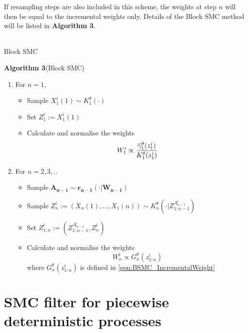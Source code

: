 \documentclass[12pt,a4paper]{article}
\begin{document}
If resampling steps are also included in this scheme, the weights at step $n$ will then be equal to the incremental weights only. Details of the Block SMC method will be listed in \textbf{Algorithm 3}.  
\\\\
\begin{algorithm}
    \caption{Block SMC}
\end{algorithm}
\textbf{Algorithm 3}(Block SMC)
\begin{enumerate}
    \item For $n=1$,
    \begin{itemize}
        \item Sample $X_1^i(1) \sim K_1^{\theta}(\cdot)$
        \item Set $Z_1^i := X_1^i(1)$
        \item Calculate and normalise the weights
        $$W_1^i \propto \frac{\Tilde{\gamma}_1^{\theta}(z_1^i)}{K_1^{\theta}(z_1^i)}$$
    \end{itemize}
    \item For $n = 2,3,..$
    \begin{itemize}
        \item Sample $\mathbf{A_{n-1}} \sim \mathbf{r_{n-1}}(\cdot|\mathbf{W_{n-1}})$
        \item Sample $Z_{n}^i:=(X_n(1),...,X_1(n)) \sim K_n^{\theta}(\cdot|Z_{1:n-1}^{A_{n-1}^i})$
        \item Set $Z_{1:n}^i := \left(Z_{1:n-1}^{A_{n-1}^i},Z_n^i\right)$
        \item Calculate and normalise the weights 
        $$W_n^i \propto G_n^{\theta}(z_{1:n}^i)$$
        where $G_n^{\theta}(z_{1:n}^i)$ is defined in \eqref{eqn:BSMC_IncrementalWeight}
        
    \end{itemize}
\end{enumerate}
\section{SMC filter for piecewise deterministic processes}
\end{document}
